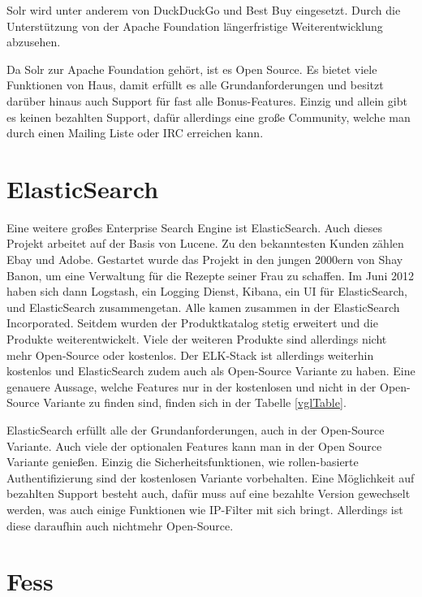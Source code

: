 Solr wird unter anderem von DuckDuckGo und Best Buy eingesetzt. Durch die Unterstützung von der Apache Foundation längerfristige Weiterentwicklung abzusehen. 

Da Solr zur Apache Foundation gehört, ist es Open Source. Es bietet viele Funktionen von Haus, damit erfüllt es alle Grundanforderungen und besitzt darüber hinaus auch Support für fast alle Bonus-Features. Einzig und allein gibt es keinen bezahlten Support, dafür allerdings eine große Community, welche man durch einen Mailing Liste oder IRC erreichen kann. \cite{TheApacheSoftwareFoundation.2019}

\section{ElasticSearch}
\label{elasticsearch}

Eine weitere großes Enterprise Search Engine ist ElasticSearch. Auch dieses Projekt arbeitet auf der Basis von Lucene. Zu den bekanntesten Kunden zählen Ebay und Adobe. Gestartet wurde das Projekt in den jungen 2000ern von Shay Banon, um eine Verwaltung für die Rezepte seiner Frau zu schaffen. Im Juni 2012 haben sich dann Logstash, ein Logging Dienst, Kibana, ein UI für ElasticSearch, und ElasticSearch zusammengetan. Alle kamen zusammen in der ElasticSearch Incorporated. Seitdem wurden der Produktkatalog stetig erweitert und die Produkte weiterentwickelt. Viele der weiteren Produkte sind allerdings nicht mehr Open-Source oder kostenlos. Der ELK-Stack ist allerdings weiterhin kostenlos und ElasticSearch zudem auch als Open-Source Variante zu haben. Eine genauere Aussage, welche Features nur in der kostenlosen und nicht in der Open-Source Variante zu finden sind, finden sich in der Tabelle \ref{vglTable}.

ElasticSearch erfüllt alle der Grundanforderungen, auch in der Open-Source Variante. Auch viele der optionalen Features kann man in der Open Source Variante genießen. Einzig die Sicherheitsfunktionen, wie rollen-basierte Authentifizierung sind der kostenlosen Variante vorbehalten. Eine Möglichkeit auf bezahlten Support besteht auch, dafür muss auf eine bezahlte Version gewechselt werden, was auch einige Funktionen wie IP-Filter mit sich bringt. Allerdings ist diese daraufhin auch nichtmehr Open-Source. \cite{Elasticsearch.2019}

\section{Fess}
\label{fess}

